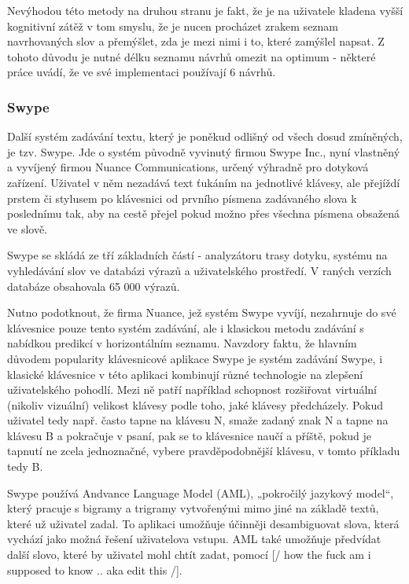 \documentclass[a4paper,11pt]{article}
\newcommand{\td}[2][]{
	{\todo[size=\footnotesize]{#2}}
}
\begin{document}
Nevýhodou této metody na druhou stranu je fakt, že je na uživatele kladena vyšší kognitivní zátěž v tom smyslu, že je nucen procházet zrakem seznam navrhovaných slov a přemýšlet, zda je mezi nimi i to, které zamýšlel napsat. Z tohoto důvodu je nutné délku seznamu návrhů omezit na optimum - některé práce uvádí, že ve své implementaci používají 6 návrhů.

\subsubsection{Swype}

Další systém zadávání textu, který je poněkud odlišný od všech dosud zmíněných, je tzv. Swype. Jde o systém původně vyvinutý firmou Swype Inc., nyní vlastněný a vyvíjený firmou Nuance Communications, určený výhradně pro dotyková zařízení. Uživatel v něm nezadává text ťukáním na jednotlivé klávesy, ale přejíždí prstem či stylusem po klávesnici od prvního písmena zadávaného slova k poslednímu tak, aby na cestě přejel pokud možno přes všechna písmena obsažená ve slově. %

Swype se skládá ze tří základních částí - analyzátoru trasy dotyku, systému na vyhledávání slov ve databázi výrazů a uživatelského prostředí. V raných verzích databáze obsahovala\td{damn.. tady mi zase utekla citace nekam do haje} 65 000 výrazů.

Nutno podotknout, že firma Nuance, jež systém Swype vyvíjí, nezahrnuje do své klávesnice pouze tento systém zadávání, ale i klasickou metodu zadávání s nabídkou predikcí v horizontálním seznamu. Navzdory faktu, že hlavním důvodem popularity klávesnicové aplikace Swype je systém zadávání Swype, i klasické klávesnice v této aplikaci kombinují různé technologie na zlepšení uživatelského pohodlí. Mezi ně patří například schopnost rozšiřovat virtuální (nikoliv vizuální) velikost klávesy podle toho, jaké klávesy předcházely. Pokud uživatel tedy např. často tapne na klávesu N, smaže zadaný znak N a tapne na klávesu B a pokračuje v psaní, pak se to klávesnice naučí a příště, pokud je tapnutí ne zcela jednoznačné, vybere pravděpodobnější klávesu, v tomto příkladu tedy B. %


Swype používá Andvance Language Model (AML), „pokročilý jazykový model“, který pracuje s bigramy a trigramy vytvořenými mimo jiné na základě textů, které už uživatel zadal. To aplikaci umožňuje účinněji desambiguovat slova, která vychází jako možná řešení uživatelova vstupu. AML také umožňuje předvídat další slovo, které by uživatel mohl chtít zadat, pomocí [/ how the fuck am i supposed to know .. aka edit this /].
\end{document}
